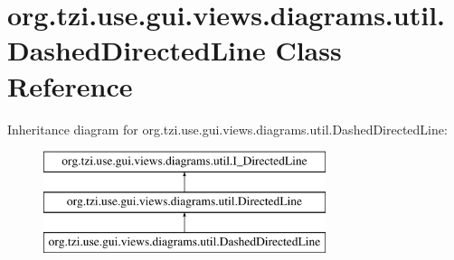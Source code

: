 \hypertarget{classorg_1_1tzi_1_1use_1_1gui_1_1views_1_1diagrams_1_1util_1_1_dashed_directed_line}{\section{org.\-tzi.\-use.\-gui.\-views.\-diagrams.\-util.\-Dashed\-Directed\-Line Class Reference}
\label{classorg_1_1tzi_1_1use_1_1gui_1_1views_1_1diagrams_1_1util_1_1_dashed_directed_line}
}
Inheritance diagram for org.\-tzi.\-use.\-gui.\-views.\-diagrams.\-util.\-Dashed\-Directed\-Line\-:\begin{figure}[H]
\begin{center}
\leavevmode
\includegraphics[height=3.000000cm]{classorg_1_1tzi_1_1use_1_1gui_1_1views_1_1diagrams_1_1util_1_1_dashed_directed_line}
\end{center}
\end{figure}
